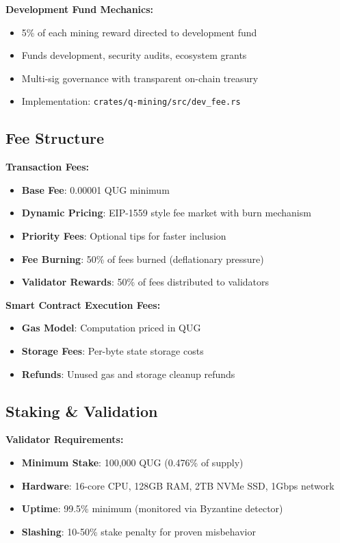 \documentclass[11pt,a4paper]{scrartcl}
\begin{document}
\textbf{Development Fund Mechanics:}
\begin{itemize}
\item 5\% of each mining reward directed to development fund
\item Funds development, security audits, ecosystem grants
\item Multi-sig governance with transparent on-chain treasury
\item Implementation: \texttt{crates/q-mining/src/dev\_fee.rs}
\end{itemize}

\subsection{Fee Structure}

\textbf{Transaction Fees:}
\begin{itemize}
\item \textbf{Base Fee}: 0.00001 QUG minimum
\item \textbf{Dynamic Pricing}: EIP-1559 style fee market with burn mechanism
\item \textbf{Priority Fees}: Optional tips for faster inclusion
\item \textbf{Fee Burning}: 50\% of fees burned (deflationary pressure)
\item \textbf{Validator Rewards}: 50\% of fees distributed to validators
\end{itemize}

\textbf{Smart Contract Execution Fees:}
\begin{itemize}
\item \textbf{Gas Model}: Computation priced in QUG
\item \textbf{Storage Fees}: Per-byte state storage costs
\item \textbf{Refunds}: Unused gas and storage cleanup refunds
\end{itemize}

\subsection{Staking \& Validation}

\textbf{Validator Requirements:}
\begin{itemize}
\item \textbf{Minimum Stake}: 100,000 QUG (0.476\% of supply)
\item \textbf{Hardware}: 16-core CPU, 128GB RAM, 2TB NVMe SSD, 1Gbps network
\item \textbf{Uptime}: 99.5\% minimum (monitored via Byzantine detector)
\item \textbf{Slashing}: 10-50\% stake penalty for proven misbehavior
\end{itemize}
\end{document}
